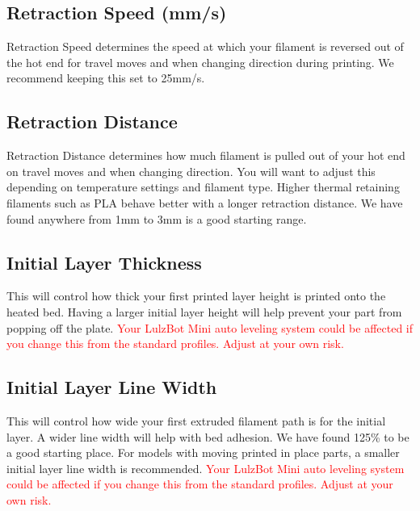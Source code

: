 
\subsection{Retraction Speed (mm/s)}
Retraction Speed determines the speed at which your filament is reversed out of the hot end for travel moves and when changing direction during printing. We recommend keeping this set to 25mm/s.

\subsection{Retraction Distance}
Retraction Distance determines how much filament is pulled out of your hot end on travel moves and when changing direction. You will want to adjust this depending on temperature settings and filament type. Higher thermal retaining filaments such as PLA behave better with a longer retraction distance. We have found anywhere from 1mm to 3mm is a good starting range.

\subsection{Initial Layer Thickness}
This will control how thick your first printed layer height is printed onto the heated bed. Having a larger initial layer height will help prevent your part from popping off the plate. \textcolor{red}{Your LulzBot Mini auto leveling system could be affected if you change this from the standard profiles. Adjust at your own risk.}
\subsection{Initial Layer Line Width}
This will control how wide your first extruded filament path is for the initial layer. A wider line width will help with bed adhesion. We have found 125\% to be a good starting place. For models with moving printed in place parts, a smaller initial layer line width is recommended. \textcolor{red}{Your LulzBot Mini auto leveling system could be affected if you change this from the standard profiles. Adjust at your own risk.}

